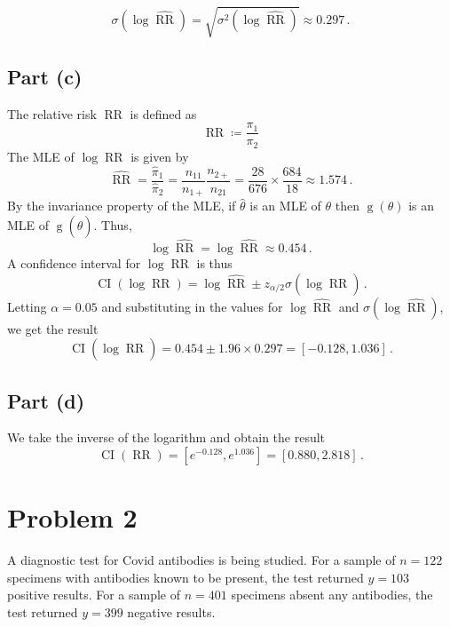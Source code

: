 \documentclass[
]{article}
\begin{document}
\[
   \sigma\!\left(\log \hat{\operatorname{RR}}\right) = \sqrt{\sigma^2(\log \hat{\operatorname{RR}})} \approx 0.297\,.
\]

\hypertarget{part-c}{%
\subsection{Part (c)}\label{part-c}}


The relative risk \(\operatorname{RR}\) is defined as \[
  \operatorname{RR}\coloneqq \frac{\pi_1}{\pi_2}
\] The MLE of \(\log \operatorname{RR}\) is given by \[
  \hat{\operatorname{RR}} = \frac{\hat\pi_1}{\hat\pi_2} = \frac{n_{1 1}}{n_{1+}} \frac{n_{2+}}{n_{2 1}} = \frac{28}{676} \times \frac{684}{18} \approx 1.574\,.
\] By the invariance property of the MLE, if \(\hat\theta\) is an MLE of
\(\theta\) then \(\operatorname{g}(\theta)\) is an MLE of
\(\operatorname{g}(\hat\theta)\). Thus, \[
  \log \hat{\operatorname{RR}} = \log \hat{\operatorname{RR}} \approx 0.454\,.
\] A confidence interval for \(\log \operatorname{RR}\) is thus \[
  \operatorname{CI}(\log\operatorname{RR}) = \log \hat{\operatorname{RR}} \pm z_{\alpha/2} \sigma(\log \hat{\operatorname{RR}})\,.
\] Letting \(\alpha = 0.05\) and substituting in the values for
\(\log \hat{\operatorname{RR}}\) and
\(\sigma(\log \hat{\operatorname{RR}})\), we get the result \[
  \operatorname{CI}(\log\hat{\operatorname{RR}}) = 0.454 \pm  1.96 \times 0.297= [-0.128,1.036]\,.
\]

\hypertarget{part-d}{%
\subsection{Part (d)}\label{part-d}}


We take the inverse of the logarithm and obtain the result \[
  \operatorname{CI}(\operatorname{RR}) = [e^{-0.128},e^{1.036}] = [0.880,2.818]\,.
\]

\hypertarget{problem-2}{%
\section{Problem 2}\label{problem-2}}

A diagnostic test for Covid antibodies is being studied. For a sample of
\(n = 122\) specimens with antibodies known to be present, the test
returned \(y = 103\) positive results. For a sample of \(n = 401\)
specimens absent any antibodies, the test returned \(y = 399\) negative
results.
\end{document}
